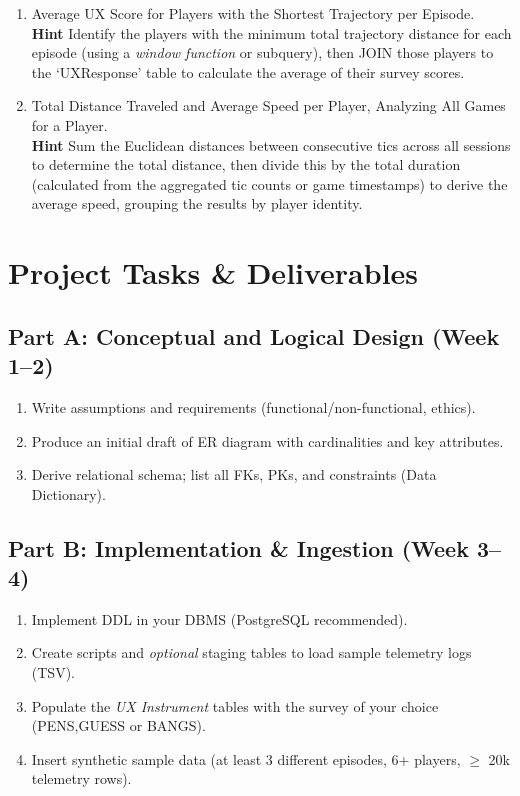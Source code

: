 \documentclass[11pt]{article}
\begin{document}
\begin{enumerate}
  \item Average UX Score for Players with the Shortest Trajectory per Episode. \\
  \textbf{Hint} Identify the players with the minimum total trajectory distance for each episode (using a \textit{window function}  or subquery), then JOIN those players to the `UXResponse' table to calculate the average of their survey scores.

  \item Total Distance Traveled and Average Speed per Player, Analyzing All Games for a Player. \\
  \textbf{Hint} Sum the Euclidean distances between consecutive tics across all sessions to determine the total distance, then divide this by the total duration (calculated from the aggregated tic counts or game timestamps) to derive the average speed, grouping the results by player identity.

\end{enumerate}

\section{Project Tasks \& Deliverables}

\subsection*{Part A: Conceptual and Logical Design (Week 1--2)}
\begin{enumerate}[leftmargin=*]
  \item Write assumptions and requirements (functional/non-functional, ethics).
  \item Produce an initial draft of ER diagram with cardinalities and key attributes.
  \item Derive relational schema; list all FKs, PKs, and constraints (Data Dictionary).
\end{enumerate}

\subsection*{Part B: Implementation \& Ingestion (Week 3--4)}
\begin{enumerate}[leftmargin=*]
  \item Implement DDL in your DBMS (PostgreSQL recommended).
  \item Create scripts and \textit{optional} staging tables to load sample telemetry logs (TSV).
  \item Populate the \textit{UX Instrument} tables with the survey of your choice (PENS,GUESS or BANGS).
  \item Insert synthetic sample data (at least 3 different episodes, 6+ players, $\geq$ 20k telemetry rows).
\end{enumerate}
\end{document}
